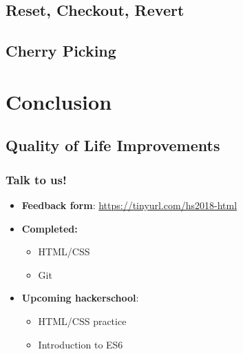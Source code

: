\documentclass[12pt]{beamer}
\begin{document}
\subsection{Reset, Checkout, Revert}
\subsection{Cherry Picking}

\section{Conclusion}
\subsection{Quality of Life Improvements}

\begin{frame}
\frametitle{Talk to us!}
\begin{itemize}
	\item \textbf{Feedback form}: \url{https://tinyurl.com/hs2018-html}
	\item \textbf{Completed:}
	\begin{itemize}
		\item HTML/CSS
		\item Git
	\end{itemize}
	\item \textbf{Upcoming hackerschool}:
	\begin{itemize}
		\item HTML/CSS practice
		\item Introduction to ES6
	\end{itemize}
\end{itemize}
\end{frame}
\end{document}
